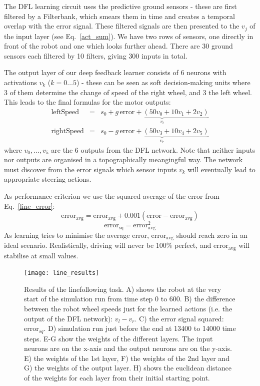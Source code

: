 \documentclass{llncs}
\begin{document}
The DFL learning circuit uses the predictive ground sensors - these are first filtered by a Filterbank, which smears them in time and creates a temporal overlap with the error signal. These filtered signals are then presented to the  $v_j$ of the input layer (see
Eq.~\ref{act_sum}). We have two rows of sensors,
one directly in front of the robot and one which looks further ahead. There are 30 ground sensors each filtered by 10 filters, giving 300 inputs in total. 

The output layer of our deep feedback learner consists of 6 neurons
with activations $v_k$ ($k=0 \ldots 5$) - these can be seen as soft
decision-making units where 3 of them determine the change of speed of
the right wheel, and 3 the left wheel. This leads to the
final formulas for the motor outputs:
\begin{eqnarray}
  \mathrm{leftSpeed} &=& s_0 + \underbrace{g\, \mathrm{error} + \left( 50 v_0 + 10 v_1 + 2 v_2 \right)}_{v_l} \\
  \mathrm{rightSpeed} &=& s_0 - \underbrace{g\, \mathrm{error} + \left( 50 v_3 + 10 v_4 + 2 v_5 \right)}_{v_r}
\end{eqnarray}
where $v_0, \ldots, v_5$ are the 6 outputs from the DFL network. Note
that neither inputs nor outputs are organised in a topographically
meangingful way. The network must discover from the error signals
which sensor inputs $v_k$ will eventually lead to appropriate steering
actions.

As performance criterion we use the squared average of the error from
Eq.~\ref{line_error}:
\begin{equation}
  \mathrm{error}_\mathrm{avg} =  \mathrm{error}_\mathrm{avg} + 0.001 (\mathrm{error} - \mathrm{error}_\mathrm{avg}) 
\end{equation}
\begin{equation}
  \mathrm{error}_\mathrm{sq} =  \mathrm{error}_\mathrm{avg}^2 \label{line_sqerr}
\end{equation}
As learning tries to minimise the average error, $\mathrm{error}_\mathrm{avg}$ should reach zero in an ideal
scenario. Realistically, driving will never be 100\% perfect, and $\mathrm{error}_\mathrm{avg}$
will stabilise at small values.


\begin{figure}[h!]
  \centering
  \texttt{[image: line\_results]}
  \caption{Results of the linefollowing task. A) shows the robot at
    the very start of the simulation run from time step 0 to 600.
    B) the difference between the robot wheel speeds just for the learned
    actions (i.e. the output of the DFL network): $v_l-v_r$.
    C) the error signal squared: $\mathrm{error}_{sq}$.
    D) simulation run just before the end at 13400 to 14000 time steps.
    E-G show the weights of the different layers. The input neurons are on the x-axis
    and the output neurons are on the y-axis.
    E) the weights of the 1st layer, F) the weights of the 2nd layer and
    G) the weights of the output layer.
        H) shows the euclidean distance of the weights for each layer from their initial starting point.
    \label{line_results}}
\end{figure}
\end{document}
